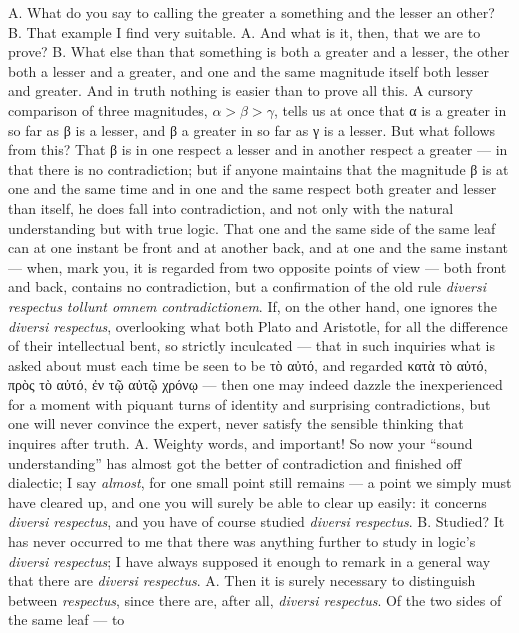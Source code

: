 \documentclass[12pt,a4paper]{book}
\begin{document}
A. What do you say to calling the greater a something and the lesser an other?
B. That example I find very suitable. A. And what is it, then, that we are to
prove? B. What else than that something is both a greater and a lesser, the
other both a lesser and a greater, and one and the same magnitude itself both
lesser and greater. And in truth nothing is easier than to prove all this. A
cursory comparison of three magnitudes, $\alpha > \beta > \gamma$, tells us at
once that α is a greater in so far as β is a lesser, and β a greater in so far
as γ is a lesser. But what follows from this? That β is in one respect a lesser
and in another respect a greater --- in that there is no contradiction; but if
anyone maintains that the magnitude β is at one and the same time and in one
and the same respect both greater and lesser than itself, he does fall into
contradiction, and not only with the natural understanding but with true logic.
That one and the same side of the same leaf can at one instant be front and at
another back, and at one and the same instant --- when, mark you, it is
regarded from two opposite points of view --- both front and back, contains no
contradiction, but a confirmation of the old rule \textit{diversi respectus
tollunt omnem contradictionem}. If, on the other hand, one ignores the
\textit{diversi respectus}, overlooking what both Plato and Aristotle, for all
the difference of their intellectual bent, so strictly inculcated --- that in
such inquiries what is asked about must each time be seen to be τὸ αὐτό, and
regarded κατὰ τὸ αὐτό,
πρὸς τὸ αὐτό, ἐν τῷ αὐτῷ χρόνῳ --- then one may indeed dazzle the
inexperienced for a moment with piquant turns of identity and surprising
contradictions, but one will never convince the expert, never satisfy the
sensible thinking that inquires after truth. A. Weighty words, and important!
So now your ``sound understanding'' has almost got the better of
contradiction and finished off dialectic; I say \emph{almost}, for one small
point still remains --- a point we simply must have cleared up, and one you
will surely be able to clear up easily: it concerns \textit{diversi respectus},
and you have of course studied \textit{diversi respectus}. B. Studied? It has
never occurred to me that there was anything further to study in logic's
\textit{diversi respectus}; I have always supposed it enough to remark in a
general way that there are \textit{diversi respectus}. A. Then it is surely
necessary to distinguish between \textit{respectus}, since there are, after
all, \textit{diversi respectus}. Of the two sides of the same leaf --- to
\end{document}
